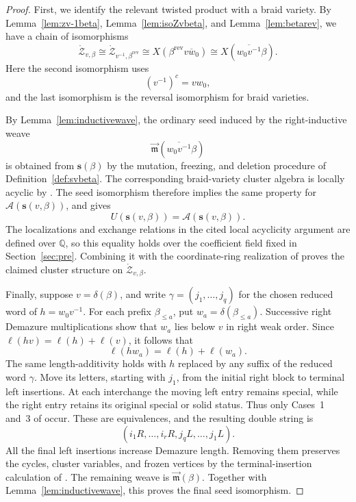 \documentclass[12pt, reqno]{amsart}
\theoremstyle{plain}
\theoremstyle{definition}
\numberwithin{equation}{section}
\begin{document}
\begin{proof}
First, we identify the relevant twisted product with a braid variety. By
Lemma~\ref{lem:zv-1beta}, Lemma~\ref{lem:isoZvbeta}, and
Lemma~\ref{lem:betarev}, we have a chain of isomorphisms
\[
\mathring{\mathcal Z}_{v,\beta}
\cong
\mathring{\mathcal Z}_{v^{-1},\beta^{\operatorname{rev}}}
\cong
X(\beta^{\operatorname{rev}}\overline{vw_0})
\cong
X(\overline{w_0v^{-1}}\beta).
\]
Here the second isomorphism uses
\[
(v^{-1})^c=vw_0,
\]
and the last isomorphism is the reversal isomorphism for braid varieties.

By Lemma~\ref{lem:inductivewave}, the ordinary seed induced by the
right-inductive weave
\[
\overrightarrow{\mathfrak m}(\overline{w_0v^{-1}}\beta)
\]
is obtained from \(\mathbf{s}(\beta)\) by the mutation, freezing, and deletion
procedure of Definition~\ref{def:svbeta}. The corresponding braid-variety
cluster algebra is locally acyclic by
\cite[Theorem~7.13]{casals2025cluster}. The seed isomorphism therefore
implies the same property for \(\mathcal A(\mathbf{s}(v,\beta))\),
and gives
\[
U(\mathbf{s}(v,\beta))=\mathcal A(\mathbf{s}(v,\beta)).
\]
The localizations and exchange relations in the cited local acyclicity
argument are defined over \(\mathbb Q\), so this equality holds
over the coefficient field fixed in Section~\ref{sec:pre}.
Combining it with the coordinate-ring realization of
\cite[Theorem~6.5]{bao2025upper} proves the claimed cluster
structure on \(\mathring{\mathcal Z}_{v,\beta}\).

Finally, suppose \(v=\delta(\beta)\), and write
\(\gamma=(j_1,\ldots,j_q)\) for the chosen reduced word of
\(h=w_0v^{-1}\). For each prefix \(\beta_{\leq a}\), put
\(w_a=\delta(\beta_{\leq a})\). Successive right Demazure
multiplications show that \(w_a\) lies below \(v\) in right
weak order. Since \(\ell(hv)=\ell(h)+\ell(v)\), it follows that
\[
\ell(hw_a)=\ell(h)+\ell(w_a).
\]
The same length-additivity holds with \(h\) replaced by any
suffix of the reduced word \(\gamma\). Move its letters, starting
with \(j_1\), from the initial right block to terminal left
insertions. At each interchange the moving left entry remains
special, while the right entry retains its original special or
solid status. Thus only Cases~1 and~3 of
\cite[Theorem~6.8]{casals2025cluster} occur. These are equivalences,
and the resulting double string is
\[
(i_1R,\ldots,i_rR,j_qL,\ldots,j_1L).
\]
All the final left insertions increase Demazure length.
Removing them preserves the cycles, cluster variables, and frozen
vertices by the terminal-insertion calculation of
\cite[Lemma~4.47 and Lemma~5.25]{casals2025cluster}.
The remaining weave is \(\overrightarrow{\mathfrak m}(\beta)\).
Together with Lemma~\ref{lem:inductivewave}, this proves the final
seed isomorphism.
\end{proof}
\end{document}
